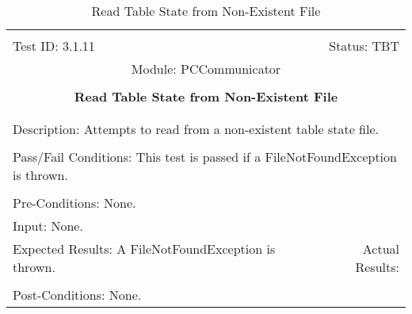 \documentclass[titlepage]{article}
\begin{document}
\begin{center}%
\begin{table}
\begin{tabular}{|l r|}\hline&\\[-2mm]
	Test ID: 3.1.11	&Status: TBT\\[-3mm]
	\multicolumn{2}{|c|}{Module: PCCommunicator}\\&\\
	\multicolumn{2}{|c|}{\textbf{\large{Read Table State from Non-Existent File}}}\\&\\\hline&\\[-3mm]
	\multicolumn{2}{|p{\textwidth}|}{Description: Attempts to read from a non-existent table state file.}\\[1mm]\hline&\\[-3mm]
	\multicolumn{2}{|p{\textwidth}|}{Pass/Fail Conditions: This test is passed if a FileNotFoundException is thrown.}\\[1mm]\hline&\\[-3mm]
	\multicolumn{2}{|p{\textwidth}|}{Pre-Conditions: None.}\\[4mm]
	\multicolumn{2}{|p{\textwidth}|}{Input: None.}\\[2mm]\hline
	\multicolumn{1}{|p{0.49\textwidth}}{Expected Results: A FileNotFoundException is thrown.}	&\multicolumn{1}{|p{0.45\textwidth}|}{Actual Results: }\\\hline&\\[-3mm]
	\multicolumn{2}{|p{\textwidth}|}{Post-Conditions: None.}\\\hline
\end{tabular}
\caption{Read Table State from Non-Existent File}
\end{table}
\end{center}
\end{document}
